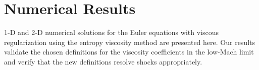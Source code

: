 \section{Numerical Results} \label{sec:results}

1-D and 2-D numerical solutions for the Euler equations with viscous regularization using the entropy viscosity method are presented here.
Our results validate the chosen definitions for the viscosity coefficients in the low-Mach limit and verify that the new definitions resolve shocks appropriately. 

